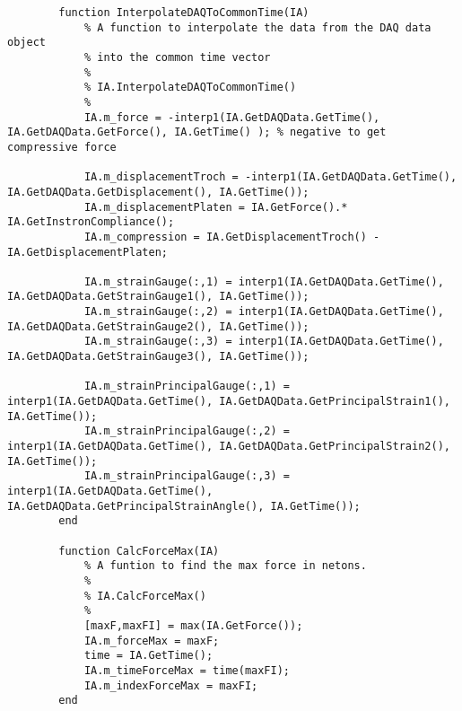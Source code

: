 \begin{lstlisting}
        function InterpolateDAQToCommonTime(IA)
            % A function to interpolate the data from the DAQ data object
            % into the common time vector
            %
            % IA.InterpolateDAQToCommonTime()
            %
            IA.m_force = -interp1(IA.GetDAQData.GetTime(), IA.GetDAQData.GetForce(), IA.GetTime() ); % negative to get compressive force
            
            IA.m_displacementTroch = -interp1(IA.GetDAQData.GetTime(), IA.GetDAQData.GetDisplacement(), IA.GetTime());
            IA.m_displacementPlaten = IA.GetForce().* IA.GetInstronCompliance();
            IA.m_compression = IA.GetDisplacementTroch() - IA.GetDisplacementPlaten;
                     
            IA.m_strainGauge(:,1) = interp1(IA.GetDAQData.GetTime(), IA.GetDAQData.GetStrainGauge1(), IA.GetTime());
            IA.m_strainGauge(:,2) = interp1(IA.GetDAQData.GetTime(), IA.GetDAQData.GetStrainGauge2(), IA.GetTime());
            IA.m_strainGauge(:,3) = interp1(IA.GetDAQData.GetTime(), IA.GetDAQData.GetStrainGauge3(), IA.GetTime());
            
            IA.m_strainPrincipalGauge(:,1) = interp1(IA.GetDAQData.GetTime(), IA.GetDAQData.GetPrincipalStrain1(), IA.GetTime());
            IA.m_strainPrincipalGauge(:,2) = interp1(IA.GetDAQData.GetTime(), IA.GetDAQData.GetPrincipalStrain2(), IA.GetTime());
            IA.m_strainPrincipalGauge(:,3) = interp1(IA.GetDAQData.GetTime(), IA.GetDAQData.GetPrincipalStrainAngle(), IA.GetTime());
        end

        function CalcForceMax(IA)
            % A funtion to find the max force in netons.
            %
            % IA.CalcForceMax()
            %
            [maxF,maxFI] = max(IA.GetForce());
            IA.m_forceMax = maxF;
            time = IA.GetTime();
            IA.m_timeForceMax = time(maxFI);
            IA.m_indexForceMax = maxFI;
        end


\end{lstlisting}
